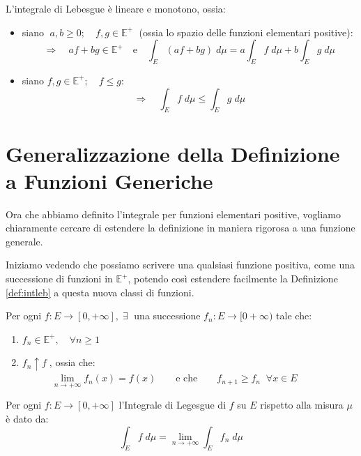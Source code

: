 \begin{proposizione}
    L'integrale di Lebesgue è lineare e monotono, ossia:
    \begin{itemize}
        \item siano $\;a, b\geq0; \quad f, g\in \mathbb{E}^+\;$ (ossia lo spazio delle funzioni elementari positive):
        \[\Rightarrow\quad af+bg\in\mathbb{E}^+\quad \text{e}\quad \int_E(af+bg)\;d\mu = a\int_Ef\;d\mu + b\int_E g\;d\mu\]
        \item siano $f, g\in\mathbb{E}^+;\quad f\leq g$:
        \[\Rightarrow\quad \int_Ef\;d\mu\leq\int_Eg\;d\mu\]
    \end{itemize}
\end{proposizione}

\section{Generalizzazione della Definizione a Funzioni Generiche}
\noindent Ora che abbiamo definito l'integrale per funzioni elementari positive, vogliamo chiaramente cercare di estendere la definizione in maniera rigorosa a una funzione generale. 

\medskip
\noindent Iniziamo vedendo che possiamo scrivere una qualsiasi funzione positiva, come una successione di funzioni in $\mathbb{E}^+$, potendo così estendere facilmente la Definizione \ref{def:intleb} a questa nuova classi di funzioni.
\begin{proposizione}
\label{prop:6.4}
    Per ogni $f:E\to[0, +\infty], \;\exists\;$ una successione $f_n:E\to[0+\infty)$ tale che:
    \begin{enumerate}
        \item $f_n\in\mathbb{E}^+, \quad \forall n\geq1$
        \item $f_n\uparrow f\;$, ossia che:
        \(\qquad \quad \underset{n\to+\infty}{\lim}f_n(x) = f(x) \qquad \text{e che}\qquad f_{n+1} \geq f_n\;\;\forall x\in E\)
    \end{enumerate}
\end{proposizione}

\newpage
\begin{definizione}
\label{def:6.5}
    Per ogni $f:E\to [0, +\infty]$ l'Integrale di Legesgue di $f$ su $E$ rispetto alla misura $\mu$  è  dato da:
    \[\boxed{\int_E f\;d\mu = \lim_{n\to+\infty}\int_E f_n\;d\mu}\]
\end{definizione}

